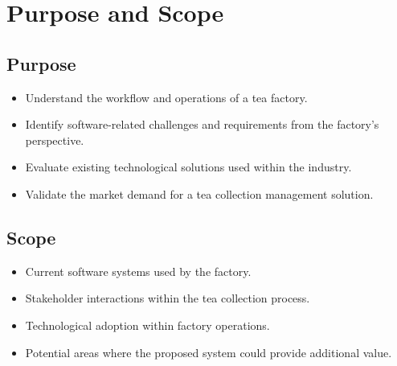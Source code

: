 \section*{Purpose and Scope}

\subsection*{Purpose}
\begin{itemize}
	\item Understand the workflow and operations of a tea factory.
	\item Identify software-related challenges and requirements from the factory's perspective.
	\item Evaluate existing technological solutions used within the industry.
	\item Validate the market demand for a tea collection management solution.
\end{itemize}

\subsection*{Scope}
\begin{itemize}
	\item Current software systems used by the factory.
	\item Stakeholder interactions within the tea collection process.
	\item Technological adoption within factory operations.
	\item Potential areas where the proposed system could provide additional value.
\end{itemize}
